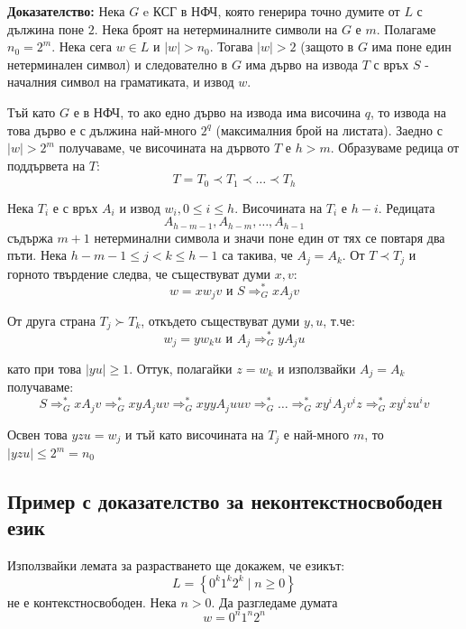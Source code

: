 \documentclass{article}
\renewcommand{\\}{\newline}
\newcommand{\sep}{\;|\;}
\newcommand{\doc}{\textbf{Доказателство: }}
\begin{document}
      \doc Нека \(G\) e КСГ в НФЧ, която генерира точно думите от \(L\) с дължина поне \(2\). Нека броят на нетерминалните символи на \(G\) е \(m\). Полагаме \(n_{0} = 2^{m}\). Нека сега \(w \in L\) и \(\left|w\right| > n_0\). Тогава \(\left|w\right| > 2\) (защото в \(G\) има поне един нетерминален символ) и следователно в \(G\) има дърво на извода \(T\) с връх \(S\) - началния символ на граматиката, и извод \(w\). 

      Тъй като \(G\) е в НФЧ, то ако едно дърво на извода има височина \(q\), то извода на това дърво е с дължина най-много \(2^{q}\) (максималния брой на листата). Заедно с\(\left|w\right| > 2^{m}\) получаваме, че височината на дървото \(T\) е \(h > m\). Образуваме редица от поддървета на \(T\): \[
        T = T_{0} \prec T_{1} \prec \dots \prec T_{h}
      \]    

      Нека \(T_{i}\) е с връх \(A_{i}\) и извод \(w_{i}, 0 \leq i \leq h\). Височината на \(T_{i}\) е \(h - i\). Редицата \[
        A_{h-m-1}, A_{h-m},\dots, A_{h-1}
      \] съдържа \(m +1\) нетерминални символа и значи поне един от тях се повтаря два пъти. Нека \(h - m -1 \leq j < k \leq h - 1\) са такива, че \(A_{j} = A_{k}\). От \(T \prec T_{j}\) и горното твърдение следва, че съществуват думи \(x, v\): \[
        w = xw_{j}v \text{ и }S \Rightarrow_{G}^{*} xA_{j}v
      \]           

      От друга страна \(T_j \succ T_{k}\), откъдето съществуват думи \(y, u\), т.че:\[
        w_{j} = yw_{k}u \text{ и }A_j \Rightarrow_{G}^{*} yA_{j}u
      \]

      като при това \(\left|yu\right|\geq 1\). Оттук, полагайки \(z = w_{k}\) и използвайки \(A_{j} = A_{k}\) получаваме: \[
        S \Rightarrow_{G}^{*} xA_{j}v \Rightarrow_{G}^{*} xyA_{j}uv \Rightarrow_{G}^{*} xyyA_{j}uuv \Rightarrow_{G}^{*} \dots \Rightarrow_{G}^{*} xy^{i}A_{j}v^{i}z \Rightarrow_{G}^{*}xy^{i}zu^{i}v
      \] 

      Освен това \(yzu = w_{j}\) и тъй като височината на \(T_{j}\) е най-много \(m\), то \(\left|yzu\right|\leq 2^{m} = n_{0}\)     

      \subsection{Пример с доказателство за неконтекстносвободен език }
      Използвайки лемата за разрастването ще докажем, че езикът: \[
        L = \left\{0^{k}1^{k}2^{k} \sep n \geq 0\right\}
      \] не е контекстносвободен. Нека \(n > 0\). Да разгледаме думата \[
        w = 0^{n}1^{n}2^{n}
      \]  
\end{document}
